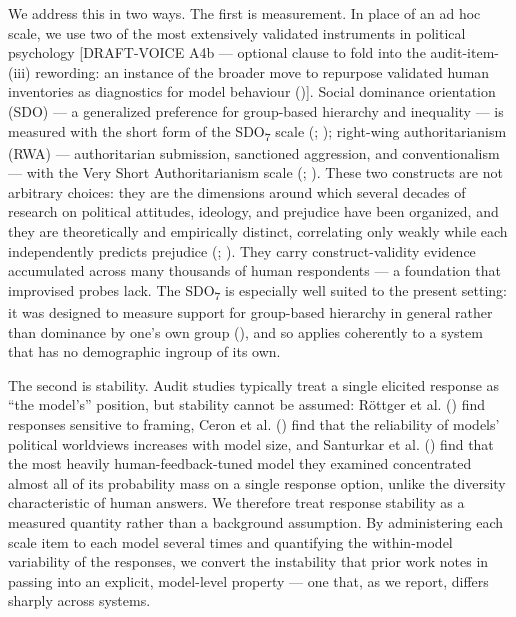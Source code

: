 \documentclass[
]{article}
\begin{document}
We address this in two ways. The first is measurement. In place of an ad
hoc scale, we use two of the most extensively validated instruments in
political psychology {[}DRAFT-VOICE A4b --- optional clause to fold into
the audit-item-(iii) rewording: an instance of the broader move to
repurpose validated human inventories as diagnostics for model behaviour
(){]}. Social dominance
orientation (SDO) --- a generalized preference for group-based hierarchy
and inequality --- is measured with the short form of the
SDO\textsubscript{7} scale (;
); right-wing
authoritarianism (RWA) --- authoritarian submission, sanctioned
aggression, and conventionalism --- with the Very Short Authoritarianism
scale (;
). These two
constructs are not arbitrary choices: they are the dimensions around
which several decades of research on political attitudes, ideology, and
prejudice have been organized, and they are theoretically and
empirically distinct, correlating only weakly while each independently
predicts prejudice (;
). They carry
construct-validity evidence accumulated across many thousands of human
respondents --- a foundation that improvised probes lack. The
SDO\textsubscript{7} is especially well suited to the present setting:
it was designed to measure support for group-based hierarchy in general
rather than dominance by one's own group (), and so applies coherently to a system that has no
demographic ingroup of its own.

The second is stability. Audit studies typically treat a single elicited
response as ``the model's'' position, but stability cannot be assumed:
Röttger et al. () find responses
sensitive to framing, Ceron et al. () find
that the reliability of models' political worldviews increases with
model size, and Santurkar et al. ()
find that the most heavily human-feedback-tuned model they examined
concentrated almost all of its probability mass on a single response
option, unlike the diversity characteristic of human answers. We
therefore treat response stability as a measured quantity rather than a
background assumption. By administering each scale item to each model
several times and quantifying the within-model variability of the
responses, we convert the instability that prior work notes in passing
into an explicit, model-level property --- one that, as we report,
differs sharply across systems.
\end{document}
